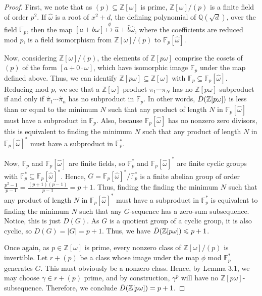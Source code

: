 \documentclass{amsart}
\theoremstyle{definition}
\newcommand{\bbz}{\mathbb{Z}}
\newcommand{\bbq}{\mathbb{Q}}
\newcommand{\bbf}{\mathbb{F}}
\renewcommand{\leq}{\leqslant}
\numberwithin{equation}{section}
\begin{document}
\begin{proof}
    First, we note that as $(p) \subseteq \bbz[\omega]$ is prime, $\bbz[\omega] /(p)$ is a finite field of order $p^2$. If $\hat{\omega}$ is a root of $x^2 + d$, the defining polynomial of $\bbq(\sqrt{d})$, over the field $\mathbb{F}_p$, then the map $[a + b\omega] \overset{\phi}{\mapsto} \hat{a} + \hat{b}\hat{\omega}$, where the coefficients are reduced mod $p$, is a field isomorphism from $\bbz[\omega]/(p)$ to $\mathbb{F}_p [\hat{\omega}]$.

    Now, considering $\bbz[\omega]/(p)$, the elements of $\bbz[p\omega]$ comprise the cosets of $(p)$ of the form $[a + 0\cdot\omega]$, which have isomorphic image $\mathbb{F}_p$ under the map defined above. Thus, we can identify $\bbz[p\omega]\subseteq \bbz[\omega]$ with $\mathbb{F}_p \subseteq \mathbb{F}_p[\hat{\omega}]$. Reducing mod $p$, we see that a $\bbz[\omega]$-product $\pi_1\dotsm\pi_N$ has no $\bbz[p\omega]$-subproduct if and only if $\hat{\pi}_1\dotsm\hat{\pi}_n$ has no subproduct in $\mathbb{F}_p$. In other words,  $\Bar{D}(\bbz[p\omega])$ is less than or equal to the minimum $N$ such that any product of length $N$ in  $\mathbb{F}_p[\hat{\omega}]$ must have a subproduct in $\mathbb{F}_p$. Also, because $\mathbb{F}_p[\hat{\omega}]$ has no nonzero zero divisors, this is equivalent to finding the minimum $N$ such that any product of length $N$ in $\mathbb{F}_p[\hat{\omega}]^*$ must have a subproduct in $\mathbb{F}_p^*$.

    Now, $\bbf_p$ and $\bbf_p[\hat{\omega}]$ are finite fields, so $\bbf_p^*$ and $\bbf_p[\hat{\omega}]^*$ are finite cyclic groups with $\bbf_p^* \subseteq \bbf_p[\hat{\omega}]^*$. Hence, $G = \bbf_p[\hat{\omega}]^*/\bbf_p^*$ is a finite abelian group of order $\frac{p^2 -1}{p-1} = \frac{(p+1)(p-1)}{p-1} = p + 1$. Thus, finding the finding the minimum $N$ such that any product of length $N$ in $\mathbb{F}_p[\hat{\omega}]^*$ must have a subproduct in $\mathbb{F}_p^*$ is equivalent to finding the minimum $N$ such that any $G$-sequence has a zero-sum subsequence. Notice, this is just $D(G)$. As $G$ is a quotient group of a cyclic group, it is also cyclic, so $D(G) = |G| = p + 1 $. Thus, we have $\Bar{D}(\bbz[p \omega]) \leq p + 1$. 

    Once again, as $p \in \bbz[\omega]$ is prime, every nonzero class of $\bbz[\omega]/(p)$ is invertible. Let $r + (p)$ be a class whose image under the map $\phi$ mod $\mathbb{F}_p^*$ generates $G$. This must obviously be a nonzero class. Hence, by Lemma 3.1, we may choose $\gamma \in r + (p)$ prime, and by construction, $\gamma^p$ will have no $\bbz[p\omega]$-subsequence. Therefore, we conclude $\Bar{D}(\bbz[p\omega]) = p + 1$.

\end{proof}
\end{document}
